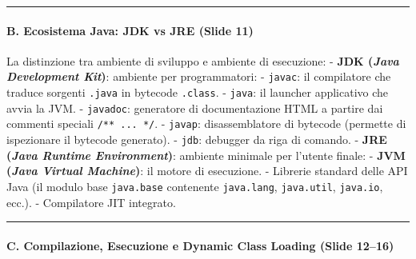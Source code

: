 \documentclass[11pt,a4paper]{article}
\newcommand{\passthrough}[1]{#1}
\begin{document}
\begin{center}\rule{0.5\linewidth}{0.5pt}\end{center}

\paragraph{B. Ecosistema Java: JDK vs JRE (Slide
11)}\label{b.-ecosistema-java-jdk-vs-jre-slide-11}

La distinzione tra ambiente di sviluppo e ambiente di esecuzione: -
\textbf{JDK (\emph{Java Development Kit})}: ambiente per programmatori:
- \passthrough{\lstinline!javac!}: il compilatore che traduce sorgenti
\passthrough{\lstinline!.java!} in bytecode
\passthrough{\lstinline!.class!}. - \passthrough{\lstinline!java!}: il
launcher applicativo che avvia la JVM. -
\passthrough{\lstinline!javadoc!}: generatore di documentazione HTML a
partire dai commenti speciali \passthrough{\lstinline!/** ... */!}. -
\passthrough{\lstinline!javap!}: disassemblatore di bytecode (permette
di ispezionare il bytecode generato). - \passthrough{\lstinline!jdb!}:
debugger da riga di comando. - \textbf{JRE (\emph{Java Runtime
Environment})}: ambiente minimale per l'utente finale: - \textbf{JVM
(\emph{Java Virtual Machine})}: il motore di esecuzione. - Librerie
standard delle API Java (il modulo base
\passthrough{\lstinline!java.base!} contenente
\passthrough{\lstinline!java.lang!},
\passthrough{\lstinline!java.util!}, \passthrough{\lstinline!java.io!},
ecc.). - Compilatore JIT integrato.

\begin{center}\rule{0.5\linewidth}{0.5pt}\end{center}

\paragraph{C. Compilazione, Esecuzione e Dynamic Class Loading (Slide
12--16)}\label{c.-compilazione-esecuzione-e-dynamic-class-loading-slide-1216}
\end{document}
